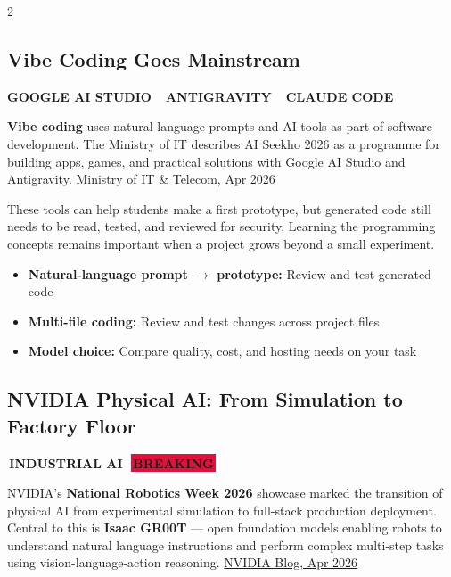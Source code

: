 \documentclass[10pt, a4paper]{article}
\newcommand{\sectiontag}[1]{%
  \noindent\colorbox{cobalt}{%
    \,\footnotesize\bfseries\color{white}\MakeUppercase{#1}\,}\,%
}
\newcommand{\hottag}{%
  \colorbox{crimson}{\,\scriptsize\bfseries\color{white}BREAKING\,}\ %
}
\begin{document}
\begin{multicols}{2}

\subsection{Vibe Coding Goes Mainstream}

{\footnotesize\bfseries\color{midgray}\MakeUppercase{%
  Google AI Studio\ \textbullet\ Antigravity\ \textbullet\ Claude Code}}

\medskip
{\small
\textbf{Vibe coding} uses natural-language prompts and AI tools as part of software development. The Ministry of IT describes AI Seekho 2026 as a programme for building apps, games, and practical solutions with Google AI Studio and Antigravity.
\href{https://www.moitt.gov.pk/NewsDetail/NjRhZWNhZGQtZGRkNC00MmJiLTk5YjctNmU0MTA0MjZhYTFi}{Ministry of IT \& Telecom, Apr 2026}

These tools can help students make a first prototype, but generated code still needs to be read, tested, and reviewed for security. Learning the programming concepts remains important when a project grows beyond a small experiment.
}

\begin{alertbox}[title={\faFilm\quad The Capability Shift in Developer Tools}]
  \begin{itemize}[itemsep=2pt, leftmargin=*,
      label={\color{crimson}}]
    \item {\small \textbf{Natural-language prompt $\to$ prototype:}
      Review and test generated code}
    \item {\small \textbf{Multi-file coding:}
      Review and test changes across project files}
    \item {\small \textbf{Model choice:}
      Compare quality, cost, and hosting needs on your task}
  \end{itemize}
\end{alertbox}

\subsection{NVIDIA Physical AI: From Simulation to Factory Floor}

\sectiontag{Industrial AI}\quad\hottag

{\small
NVIDIA's \textbf{National Robotics Week 2026} showcase marked the transition of physical AI from experimental simulation to full-stack production deployment. Central to this is \textbf{Isaac GR00T} --- open foundation models enabling robots to understand natural language instructions and perform complex multi-step tasks using vision-language-action reasoning.
\href{https://blogs.nvidia.com/blog/national-robotics-week-2026/}{NVIDIA Blog, Apr 2026}

}
\end{multicols}
\end{document}
